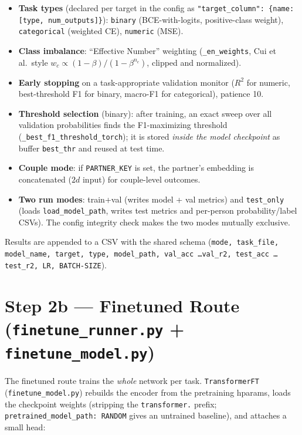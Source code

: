 \documentclass[11pt,a4paper]{article}
\newcommand{\file}[1]{\texttt{\small #1}}
\newcommand{\code}[1]{\texttt{\small #1}}
\begin{document}
\begin{itemize}[nosep]
  \item \textbf{Task types} (declared per target in the config as
        \code{"target\_column": \{name: [type, num\_outputs]\}}):
        \code{binary} (BCE-with-logits, positive-class weight),
        \code{categorical} (weighted CE), \code{numeric} (MSE).
  \item \textbf{Class imbalance}: ``Effective Number'' weighting
        (\code{\_en\_weights}, Cui et al.\ style
        $w_c \propto (1-\beta)/(1-\beta^{n_c})$, clipped and normalized).
  \item \textbf{Early stopping} on a task-appropriate validation monitor
        ($R^2$ for numeric, best-threshold F1 for binary, macro-F1 for
        categorical), patience 10.
  \item \textbf{Threshold selection} (binary): after training, an exact sweep
        over all validation probabilities finds the F1-maximizing threshold
        (\code{\_best\_f1\_threshold\_torch}); it is stored \emph{inside the
        model checkpoint} as buffer \code{best\_thr} and reused at test time.
  \item \textbf{Couple mode}: if \code{PARTNER\_KEY} is set, the partner's
        embedding is concatenated ($2d$ input) for couple-level outcomes.
  \item \textbf{Two run modes}: train+val (writes model + val metrics) and
        \code{test\_only} (loads \code{load\_model\_path}, writes test metrics
        and per-person probability/label CSVs). The config integrity check
        makes the two modes mutually exclusive.
\end{itemize}

Results are appended to a CSV with the shared schema
(\code{mode, task\_file, model\_name, target, type, model\_path,
val\_acc \dots val\_r2, test\_acc \dots test\_r2, LR, BATCH-SIZE}).

\section{Step 2b --- Finetuned Route (\file{finetune\_runner.py} +
\file{finetune\_model.py})}\label{sec:finetune}

The finetuned route trains the \emph{whole} network per task.
\code{TransformerFT} (\file{finetune\_model.py}) rebuilds the encoder from the
pretraining hparams, loads the checkpoint weights (stripping the
\code{transformer.} prefix; \code{pretrained\_model\_path: RANDOM} gives an
untrained baseline), and attaches a small head:
\end{document}
